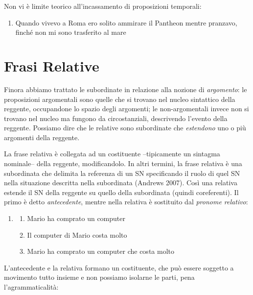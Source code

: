 \documentclass[
  a4paper,
  twoside,
  11pt,
  chapterprefix=false,
  bibliography=totocnumbered,
  listof=flat]{scrbook}
\providecommand{\tightlist}{%
  \setlength{\itemsep}{0pt}\setlength{\parskip}{0pt}}
\begin{document}
Non vi è limite teorico all'incassamento di proposizioni temporali:

\begin{enumerate}
\def\labelenumi{(\arabic{enumi})}
\setcounter{enumi}{120}
\tightlist
\item
  Quando vivevo a Roma ero solito ammirare il Pantheon mentre pranzavo, finché non mi sono trasferito al mare
\end{enumerate}

\hypertarget{frasi-relative}{%
\chapter{Frasi Relative}\label{frasi-relative}}

Finora abbiamo trattato le subordinate in relazione alla nozione di \emph{argomento}: le proposizioni argomentali sono quelle che si trovano nel nucleo sintattico della reggente, occupandone lo spazio degli argomenti; le non-argomentali invece non si trovano nel nucleo ma fungono da circostanziali, descrivendo l'evento della reggente. Possiamo dire che le relative sono subordinate che \emph{estendono} uno o più argomenti della reggente.

La frase relativa è collegata ad un costituente --tipicamente un sintagma nominale-- della reggente, modificandolo.
In altri termini, la frase relativa è una subordinata che delimita la referenza di un SN specificando il ruolo di quel SN nella situazione descritta nella subordinata (Andrews 2007).
Così una relativa estende il SN della reggente su quello della subordinata (quindi coreferenti). Il primo è detto \emph{antecedente}, mentre nella relativa è sostituito dal \emph{pronome relativo}:

\begin{enumerate}
\def\labelenumi{(\arabic{enumi})}
\setcounter{enumi}{121}
\item
  \begin{enumerate}
  \def\labelenumii{\alph{enumii}.}
  \tightlist
  \item
    Mario ha comprato un computer
  \item
    Il computer di Mario costa molto
  \item
    Mario ha comprato un computer che costa molto
  \end{enumerate}
\end{enumerate}

L'antecedente e la relativa formano un costituente, che può essere soggetto a movimento tutto insieme e non possiamo isolarne le parti, pena l'agrammaticalità:
\end{document}
